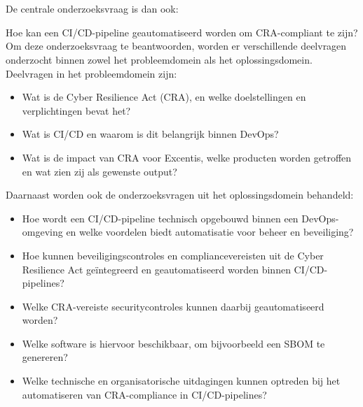 \section{}%
\label{sec:onderzoeksvraag}

De centrale onderzoeksvraag is dan ook: 

Hoe kan een CI/CD-pipeline geautomatiseerd worden om CRA-compliant te zijn? 
Om deze onderzoeksvraag te beantwoorden, worden er verschillende deelvragen onderzocht binnen zowel het probleemdomein als het oplossingsdomein. Deelvragen in het probleemdomein zijn:
\begin{itemize}
  \item Wat is de Cyber Resilience Act (CRA), en welke doelstellingen en verplichtingen bevat het?
  \item Wat is CI/CD en waarom is dit belangrijk binnen DevOps?
  \item Wat is de impact van CRA voor Excentis, welke producten worden getroffen en wat zien zij als gewenste output?
\end{itemize}
Daarnaast worden ook de onderzoeksvragen uit het oplossingsdomein behandeld:
\begin{itemize}
  \item Hoe wordt een CI/CD-pipeline technisch opgebouwd binnen een DevOps-\\omgeving en welke voordelen biedt automatisatie voor beheer en beveiliging?
  \item Hoe kunnen beveiligingscontroles en compliancevereisten uit de Cyber Resilience Act geïntegreerd en geautomatiseerd worden binnen CI/CD-pipelines?
  \item Welke CRA-vereiste securitycontroles kunnen daarbij geautomatiseerd worden? 
  \item Welke software is hiervoor beschikbaar, om bijvoorbeeld een SBOM te genereren?
  \item Welke technische en organisatorische uitdagingen kunnen optreden bij het automatiseren van CRA-compliance in CI/CD-pipelines?
\end{itemize}

\section{}%
\label{sec:onderzoeksdoelstelling}

